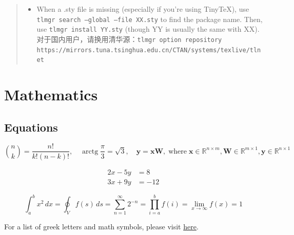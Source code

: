 \documentclass[a4paper]{article}
\DeclareMathOperator{\arctg}{arctg}
\renewcommand\x{\mathbf{x}}
\newcommand\y{\mathbf{y}}
\newcommand\W{\mathbf{W}}
\newcommand\R{\mathbb{R}}
\begin{document}
\begin{quote}
\begin{itemize}
\begin{itemize}
\item You might think that a more lightweight bundle such as \href{https://yihui.org/tinytex/}{Tiny\TeX{}} is preferrable, but you end up having to install packages every time you use a new template. 
\item Compared to popular versatile editor such as Visual Studio Code or IDEs, \TeX{} Studio, though ugly in interface, is dedicated to \TeX{} and contains many shortcuts.
\item Lua\LaTeX is the newest \TeX{} engine. It provides a new programming framework which some new features require.
\end{itemize}
\item When a .sty file is missing (especially if you're using Tiny\TeX{}), use \texttt{tlmgr search --global --file XX.sty} to find the package name. Then, use \texttt{tlmgr install YY.sty} (though YY is usually the same with XX). 对于国内用户，请换用清华源：\texttt{tlmgr option repository https://mirrors.tuna.tsinghua.edu.cn/CTAN/systems/texlive/tlnet
}
\end{itemize}
\end{quote}

\section{Mathematics}

\subsection{Equations}

\begin{equation}
	\binom{n}{k} = \frac{n!}{k!(n-k)!},\quad
	\arctg \frac{\pi}{3} = \sqrt{3},\quad
	\y = \x\W,\; \text{where}\; \x \in \R^{n\times m}, \W \in \R^{m\times 1}, \y \in \R^{n\times 1}
\end{equation}

\begin{align}
2x - 5y &=  8 \\ 
3x + 9y &=  -12
\end{align}

\begin{equation}
\int_{a}^{b} x^2 \,dx = \oint_V f(s) \,ds = \sum_{n=1}^{\infty} 2^{-n} = \prod_{i=a}^{b} f(i) = \lim_{x\to\infty} f(x) = 1
\end{equation}

For a list of greek letters and math symbols, please visit \href{https://www.overleaf.com/learn/latex/List_of_Greek_letters_and_math_symbols}{here}.
\end{document}
